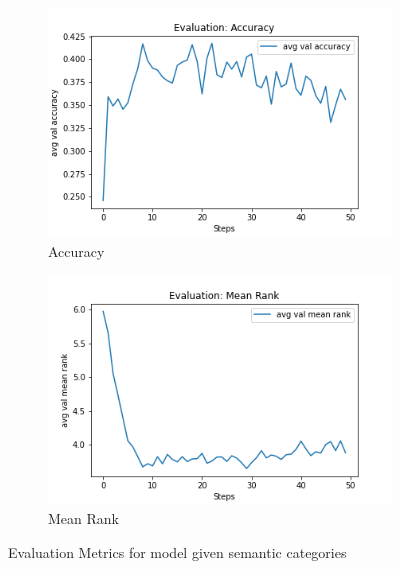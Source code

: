 
\begin{figure}[H]
     \centering
     \begin{subfigure}[b]{0.4\textwidth}
         \centering
         \includegraphics[width=\textwidth]{./figure/results/semantic_categories/eval/avg val accuracy.png}
         \caption{Accuracy}
         \label{fig:category_accuracy}
     \end{subfigure}
     \hfill
     \begin{subfigure}[b]{0.4\textwidth}
         \centering
         \includegraphics[width=\textwidth]{./figure/results/semantic_categories/eval/avg val mean rank.png}
         \caption{Mean Rank}
         \label{fig:category_mean_rank}
     \end{subfigure}
     \caption{Evaluation Metrics for model given semantic categories}
     \label{fig:category_metrics}
\end{figure}

